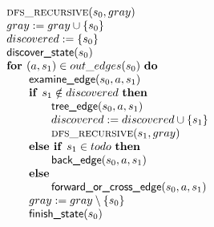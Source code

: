 \documentclass{article}
\newcommand{\Space}{\text{\ }}
\newcommand{\If}{\text{\textbf{if }}}
\newcommand{\Do}{\text{\textbf{do }}}
\newcommand{\Then}{\text{\textbf{then }}}
\newcommand{\Else}{\text{\textbf{else }}}
\newcommand{\For}{\text{\textbf{for }}}
\begin{document}
\[
\begin{tabular}{l}
\textsc{dfs\_recursive}($s_0, gray$) \\
$gray := gray \cup \{ s_0 \}$ \\
$discovered := \{ s_0 \}$ \\
$\textsf{discover\_state}(s_0)$ \\
$\For (a, s_1) \in out\_edges(s_0) \Space \Do$ \\
\qquad $\textsf{examine\_edge}(s_0, a, s_1)$ \\
\qquad $\If s_1 \notin discovered \Space \Then$ \\
\qquad \qquad $\textsf{tree\_edge}(s_0, a, s_1)$ \\
\qquad \qquad $discovered := discovered \cup \{ s_1 \}$ \\
\qquad \qquad \textsc{dfs\_recursive}($s_1, gray$) \\
\qquad $\Else \If s_1 \in todo \Space \Then$ \\
\qquad \qquad $\textsf{back\_edge}(s_0, a, s_1)$ \\
\qquad \Else \\
\qquad \qquad $\textsf{forward\_or\_cross\_edge}(s_0, a, s_1)$ \\
\qquad $gray := gray \setminus \{ s_0 \}$ \\
\qquad $\textsf{finish\_state}(s_0)$ \\
\end{tabular}
\]
\end{document}
